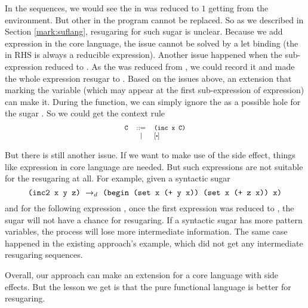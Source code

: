 In the sequences, we would see the  in  was reduced to $1$ getting from the environment. But other  in the program cannot be replaced. So as we described in Section \ref{mark:suflang}, resugaring for such sugar is unclear. Because we add  expression in the core language, the issue cannot be solved by a let binding (the  in RHS is always a reducible expression). 
Another issue happened when the sub-expression  reduced to . As the  was reduced from , we could record it and made the whole expression resugar to . Based on the issues above, an extension that marking the variable (which may appear at the first sub-expression of  expression) can make it. During the  function, we can simply ignore the  as a possible hole for the sugar . So we could get the context rule 
\[
	{\footnotesize
	\begin{array}{lcl}
		\Code{C}&::=&\Code{(inc x C)}\\
		& | &[\bigcdot]
	\end{array}
	}
\]

But there is still another issue. If we want to make use of the side effect, things like  expression in core language are needed. But such expressions are not suitable for the resugaring at all. For example, given a syntactic sugar 
\[\texttt{(inc2 x y z)} ~\rightarrow_d~ \texttt{(begin (set x (+ y x)) (set x (+ z x)) x)}\]
and for the following expression , once the first  expression was reduced to , the  sugar will not have a chance for resugaring. If a syntactic sugar has more pattern variables, the process will lose more intermediate information. The same case happened in the existing approach\cite{resugaring}'s  example, which did not get any intermediate resugaring sequences.

Overall, our approach can make an extension for a core language with side effects. But the lesson we get is that the pure functional language is better for resugaring.

